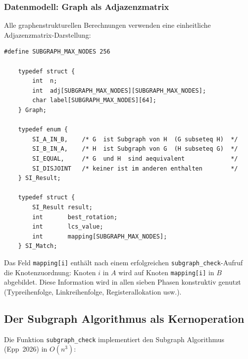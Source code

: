 ﻿\documentclass[a4paper,12pt]{article}
\theoremstyle{definition}
\begin{document}
\subsubsection{Datenmodell: Graph als Adjazenzmatrix}

Alle graphenstrukturellen Berechnungen verwenden eine einheitliche
Adjazenzmatrix-Darstellung:

\begin{lstlisting}[style=cstyle, caption={Graph-Datenstruktur (subgraph.h)},
	label=lst:graph]
	#define SUBGRAPH_MAX_NODES 256
	
	typedef struct {
		int  n;
		int  adj[SUBGRAPH_MAX_NODES][SUBGRAPH_MAX_NODES];
		char label[SUBGRAPH_MAX_NODES][64];
	} Graph;
	
	typedef enum {
		SI_A_IN_B,    /* G  ist Subgraph von H  (G subseteq H)  */
		SI_B_IN_A,    /* H  ist Subgraph von G  (H subseteq G)  */
		SI_EQUAL,     /* G  und H  sind aequivalent             */
		SI_DISJOINT   /* keiner ist im anderen enthalten        */
	} SI_Result;
	
	typedef struct {
		SI_Result result;
		int       best_rotation;
		int       lcs_value;
		int       mapping[SUBGRAPH_MAX_NODES];
	} SI_Match;
\end{lstlisting}

Das Feld \texttt{mapping[i]} enthält nach einem erfolgreichen
\texttt{subgraph\_check}-Aufruf die Knotenzuordnung: Knoten $i$ in $A$ wird
auf Knoten \texttt{mapping[i]} in $B$ abgebildet. Diese Information wird in
allen sieben Phasen konstruktiv genutzt (Typreihenfolge, Linkreihenfolge,
Registerallokation usw.).

\subsection{Der Subgraph Algorithmus als Kernoperation}
\label{sec:impl-subgraph}

Die Funktion \texttt{subgraph\_check} implementiert den Subgraph Algorithmus
(Epp~2026) in $O(n^3)$:
\end{document}
